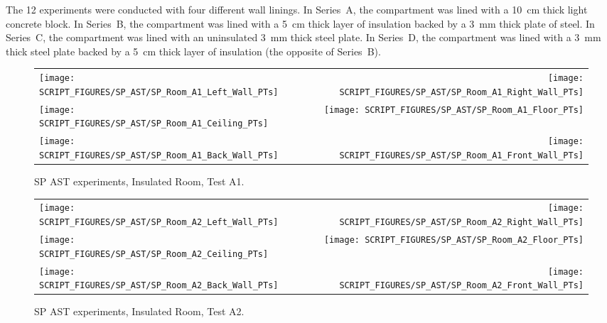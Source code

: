 The 12 experiments were conducted with four different wall linings. In Series~A, the compartment was lined with a 10~cm thick light concrete block. In Series~B, the compartment was lined with a 5~cm thick layer of insulation backed by a 3~mm thick plate of steel. In Series~C, the compartment was lined with an uninsulated 3~mm thick steel plate. In Series~D, the compartment was lined with a 3~mm thick steel plate backed by a 5~cm thick layer of insulation (the opposite of Series~B).

\newpage

\begin{figure}[p]
\begin{tabular*}{\textwidth}{l@{\extracolsep{\fill}}r}
\texttt{[image: SCRIPT\_FIGURES/SP\_AST/SP\_Room\_A1\_Left\_Wall\_PTs]} &  \texttt{[image: SCRIPT\_FIGURES/SP\_AST/SP\_Room\_A1\_Right\_Wall\_PTs]}  \\
\texttt{[image: SCRIPT\_FIGURES/SP\_AST/SP\_Room\_A1\_Ceiling\_PTs]}   &  \texttt{[image: SCRIPT\_FIGURES/SP\_AST/SP\_Room\_A1\_Floor\_PTs]}  \\
\texttt{[image: SCRIPT\_FIGURES/SP\_AST/SP\_Room\_A1\_Back\_Wall\_PTs]} &  \texttt{[image: SCRIPT\_FIGURES/SP\_AST/SP\_Room\_A1\_Front\_Wall\_PTs]}
\end{tabular*}
\caption[SP AST experiments, Insulated Room, Test A1]{SP AST experiments, Insulated Room, Test A1.}
\label{SP_Room_A1_PTs}
\end{figure}

\begin{figure}[p]
\begin{tabular*}{\textwidth}{l@{\extracolsep{\fill}}r}
\texttt{[image: SCRIPT\_FIGURES/SP\_AST/SP\_Room\_A2\_Left\_Wall\_PTs]} &  \texttt{[image: SCRIPT\_FIGURES/SP\_AST/SP\_Room\_A2\_Right\_Wall\_PTs]}  \\
\texttt{[image: SCRIPT\_FIGURES/SP\_AST/SP\_Room\_A2\_Ceiling\_PTs]}   &  \texttt{[image: SCRIPT\_FIGURES/SP\_AST/SP\_Room\_A2\_Floor\_PTs]}  \\
\texttt{[image: SCRIPT\_FIGURES/SP\_AST/SP\_Room\_A2\_Back\_Wall\_PTs]} &  \texttt{[image: SCRIPT\_FIGURES/SP\_AST/SP\_Room\_A2\_Front\_Wall\_PTs]}
\end{tabular*}
\caption[SP AST experiments, Insulated Room, Test A2]{SP AST experiments, Insulated Room, Test A2.}
\label{SP_Room_A2_PTs}
\end{figure}

